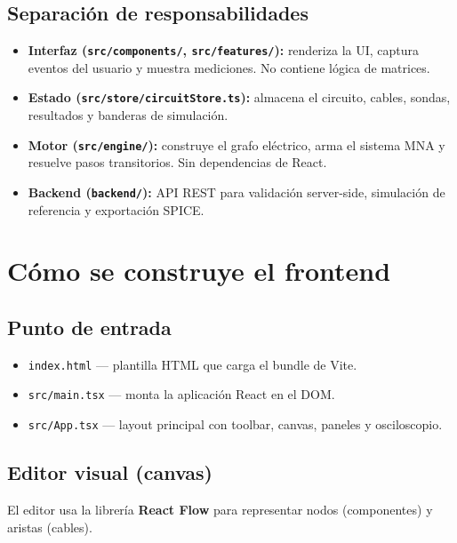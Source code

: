 \documentclass[12pt,a4paper]{article}
\begin{document}
\subsection{Separación de responsabilidades}

\begin{itemize}
  \item \textbf{Interfaz (\texttt{src/components/}, \texttt{src/features/}):} renderiza la UI, captura eventos del usuario y muestra mediciones. No contiene lógica de matrices.
  \item \textbf{Estado (\texttt{src/store/circuitStore.ts}):} almacena el circuito, cables, sondas, resultados y banderas de simulación.
  \item \textbf{Motor (\texttt{src/engine/}):} construye el grafo eléctrico, arma el sistema MNA y resuelve pasos transitorios. Sin dependencias de React.
  \item \textbf{Backend (\texttt{backend/}):} API REST para validación server-side, simulación de referencia y exportación SPICE.
\end{itemize}

\section{Cómo se construye el frontend}

\subsection{Punto de entrada}

\begin{itemize}
  \item \texttt{index.html} --- plantilla HTML que carga el bundle de Vite.
  \item \texttt{src/main.tsx} --- monta la aplicación React en el DOM.
  \item \texttt{src/App.tsx} --- layout principal con toolbar, canvas, paneles y osciloscopio.
\end{itemize}

\subsection{Editor visual (canvas)}

El editor usa la librería \textbf{React Flow} para representar nodos (componentes) y aristas (cables).
\end{document}

